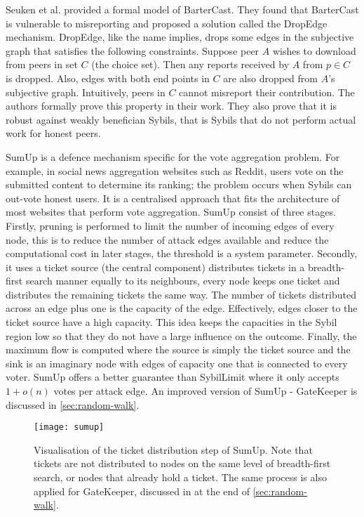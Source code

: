 Seuken et al. provided a formal model of BarterCast. They found that BarterCast
is vulnerable to misreporting and proposed a solution called the DropEdge
mechanism\cite{seuken2011sybil, seuken2014sybil}. DropEdge, like the name
implies, drops some edges in the subjective graph that satisfies the following
constraints. Suppose peer $A$ wishes to download from peers in set $C$ (the
choice set). Then any reports received by $A$ from $p \in C$ is dropped. Also,
edges with both end points in $C$ are also dropped from $A$'s subjective graph.
Intuitively, peers in $C$ cannot misreport their contribution. The authors
formally prove this property in their work. They also prove that it is robust
against weakly benefician Sybils, that is Sybils that do not perform actual work
for honest peers.

SumUp\cite{tran2009sybil} is a defence mechanism specific for the vote
aggregation problem. For example, in social news aggregation websites such as
Reddit, users vote on the submitted content to determine its ranking; the
problem occurs when Sybils can out-vote honest users. It is a centralised
approach that fits the architecture of most websites that perform vote
aggregation. SumUp consist of three stages. Firstly, pruning is performed to
limit the number of incoming edges of every node, this is to reduce the number
of attack edges available and reduce the computational cost in later stages, the
threshold is a system parameter. Secondly, it uses a ticket source (the central
component) distributes tickets in a breadth-first search manner equally to its
neighbours, every node keeps one ticket and distributes the remaining tickets
the same way. The number of tickets distributed across an edge plus one is the
capacity of the edge. Effectively, edges closer to the ticket source have a high
capacity. This idea keeps the capacities in the Sybil region low so that they do
not have a large influence on the outcome. Finally, the maximum flow is computed
where the source is simply the ticket source and the sink is an imaginary node
with edges of capacity one that is connected to every voter. SumUp offers a
better guarantee than SybilLimit where it only accepts $1 + o(n)$ votes per
attack edge. An improved version of SumUp - GateKeeper is discussed in
\autoref{sec:random-walk}.

\begin{figure}
  \centering
  \texttt{[image: sumup]}
  \caption{Visualisation of the ticket distribution step of SumUp. Note that
    tickets are not distributed to nodes on the same level of breadth-first
    search, or nodes that already hold a ticket. The same process is also
    applied for GateKeeper, discussed in at the end of
    \autoref{sec:random-walk}.}
  \label{fig:sumup}
\end{figure}

